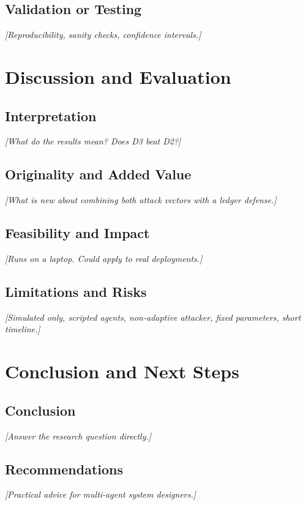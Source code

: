 \documentclass[a4paper, 11pt]{article}
\begin{document}
\subsection{Validation or Testing}
\textit{[Reproducibility, sanity checks, confidence intervals.]}

\newpage

\section{Discussion and Evaluation}

\subsection{Interpretation}
\textit{[What do the results mean? Does D3 beat D2?]}

\subsection{Originality and Added Value}
\textit{[What is new about combining both attack vectors with a ledger defense.]}

\subsection{Feasibility and Impact}
\textit{[Runs on a laptop. Could apply to real deployments.]}

\subsection{Limitations and Risks}
\textit{[Simulated only, scripted agents, non-adaptive attacker, fixed parameters, short timeline.]}

\newpage

\section{Conclusion and Next Steps}

\subsection{Conclusion}
\textit{[Answer the research question directly.]}

\subsection{Recommendations}
\textit{[Practical advice for multi-agent system designers.]}
\end{document}
